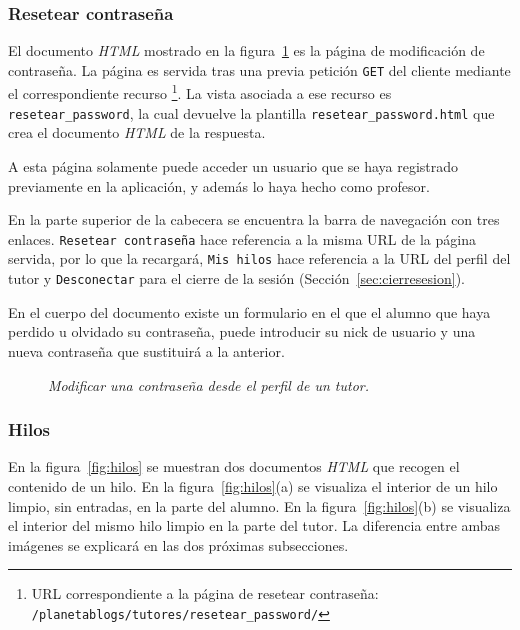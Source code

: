\documentclass[a4paper, 12pt]{book}
\begin{document}
\subsubsection{Resetear contrase\~na} 
\label{sec:resetpass}
El documento \textit{HTML} mostrado en la figura~\ref{fig:resetpass} es la p\'agina de modificaci\'on de contrase\~na. La p\'agina es servida 
tras una previa petici\'on \texttt{GET} del cliente mediante el correspondiente recurso \footnote{URL correspondiente a la p\'agina de resetear contrase\~na: 
\texttt{/planetablogs/tutores/resetear\_password/}}. La vista asociada a ese recurso es \texttt{resetear\_password}, la cual devuelve la plantilla 
\texttt{resetear\_password.html} que crea el documento \textit{HTML} de la respuesta.

A esta p\'agina solamente puede acceder un usuario que se haya registrado previamente en la aplicaci\'on, y adem\'as lo haya hecho como profesor. 

En la parte superior de la cabecera se encuentra la barra de navegaci\'on con tres enlaces. \texttt{Resetear contrase\~na} hace referencia a la misma 
URL de la p\'agina servida, por lo que la recargar\'a, \texttt{Mis hilos} hace referencia a la URL del perfil del tutor y \texttt{Desconectar} para 
el cierre de la sesi\'on (Secci\'on~\ref{sec:cierresesion}).

En el cuerpo del documento existe un formulario en el que el alumno que haya perdido u olvidado su contrase\~na, puede introducir su nick de usuario y una
nueva contrase\~na que sustituir\'a a la anterior.

\begin{figure}
  \centering
  \caption{\textit{Modificar una contrase\~na desde el perfil de un tutor.}}
  \label{fig:resetpass}
\end{figure}




\subsubsection{Hilos} 
\label{sec:hilos}
En la figura~\ref{fig:hilos} se muestran dos documentos \textit{HTML} que recogen el contenido de un hilo. En la figura~\ref{fig:hilos}(a) se visualiza el interior
de un hilo limpio, sin entradas, en la parte del alumno. En la figura~\ref{fig:hilos}(b) se visualiza el interior del mismo hilo limpio en la parte del 
tutor. La diferencia entre ambas im\'agenes se explicar\'a en las dos pr\'oximas subsecciones.
\end{document}
